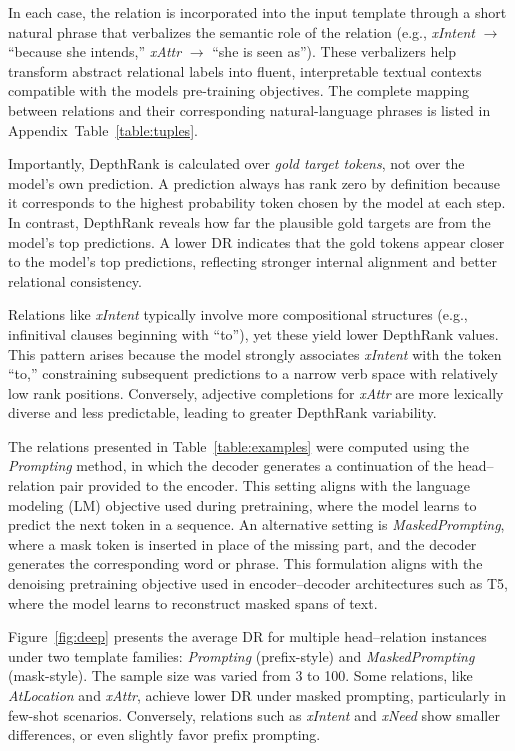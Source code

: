 \documentclass{i4c-en}
\begin{document}
In each case, the relation is incorporated into the input template through a short natural phrase that verbalizes the semantic role of the relation (e.g., \textit{xIntent} $\rightarrow$ “because she intends,” \textit{xAttr} $\rightarrow$ “she is seen as”). These verbalizers help transform abstract relational labels into fluent, interpretable textual contexts compatible with the models pre-training objectives. The complete mapping between relations and their corresponding natural-language phrases is listed in Appendix~Table~\ref{table:tuples}.

Importantly, DepthRank is calculated over \emph{gold target tokens}, not over the model’s own prediction. A prediction always has rank zero by definition because it corresponds to the highest probability token chosen by the model at each step. In contrast, DepthRank reveals how far the plausible gold targets are from the model’s top predictions. A lower DR indicates that the gold tokens appear closer to the model’s top predictions, reflecting stronger internal alignment and better relational consistency.

Relations like \textit{xIntent} typically involve more compositional structures (e.g., infinitival clauses beginning with “to”), yet these yield lower DepthRank values. This pattern arises because the model strongly associates \textit{xIntent} with the token “to,” constraining subsequent predictions to a narrow verb space with relatively low rank positions. Conversely, adjective completions for \textit{xAttr} are more lexically diverse and less predictable, leading to greater DepthRank variability.

The relations presented in Table~\ref{table:examples} were computed using the \textit{Prompting} method, in which the decoder generates a continuation of the head–relation pair provided to the encoder. This setting aligns with the language modeling (LM) objective used during pretraining, where the model learns to predict the next token in a sequence.
An alternative setting is \textit{MaskedPrompting}, where a mask token is inserted in place of the missing part, and the decoder generates the corresponding word or phrase. This formulation aligns with the denoising pretraining objective used in encoder–decoder architectures such as T5, where the model learns to reconstruct masked spans of text.


Figure~\ref{fig:deep} presents the average DR for multiple head--relation instances under two template families: \textit{Prompting} (prefix-style) and \textit{MaskedPrompting} (mask-style). The sample size was varied from 3 to 100. Some relations, like \textit{AtLocation} and \textit{xAttr}, achieve lower DR under masked prompting, particularly in few-shot scenarios. Conversely, relations such as \textit{xIntent} and \textit{xNeed} show smaller differences, or even slightly favor prefix prompting.  
\end{document}

